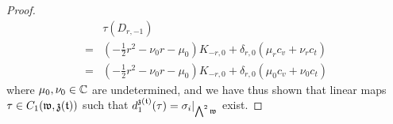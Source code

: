 \begin{proof}
$$\begin{aligned}
                            & \tau( D_{r, -1} )
                            \\
                            = & \left( -\frac12 r^2 - \nu_0 r - \mu_0 \right) K_{-r, 0} + \delta_{r, 0} ( \mu_r c_v + \nu_r c_t )
                            \\
                            = & \left( -\frac12 r^2 - \nu_0 r - \mu_0 \right) K_{-r, 0} + \delta_{r, 0} ( \mu_0 c_v + \nu_0 c_t )
                        \end{aligned}
                    $$
                where $\mu_0, \nu_0 \in \mathbb{C}$ are undetermined, and we have thus shown that linear maps $\tau \in C_1(\mathfrak{w}, \mathfrak{z}(\mathfrak{t}))$ such that $d_1^{\mathfrak{z}(\mathfrak{t})}(\tau) = \sigma_i|_{\bigwedge^2 \mathfrak{w}}$ exist.
            \end{proof}

